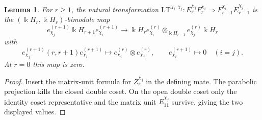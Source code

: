 \documentclass[12pt]{amsart}
\numberwithin{itemcounter}{subsection}
\theoremstyle{plain}
\newtheorem{lemma}[theorem]{Lemma}
\theoremstyle{definition}
\theoremstyle{remark}
\numberwithin{equation}{section}
\def\k{\Bbbk}
\def\Lcross{\mathrm{LT}}
\begin{document}
\begin{lemma}\label{rcrosswreath}
For $r\geq1$, the natural transformation
$\Lcross^{\chi_i,\chi_j}:E^{\chi_j}_rF^{\chi_i}_r
\Rightarrow F^{\chi_i}_{r-1}E^{\chi_j}_{r-1}$ is the
$(\k H_r,\k H_r)$-bimodule map
\[
 e^{(r+1)}_{\chi_j}\k H_{r+1}e^{(r+1)}_{\chi_i}
 \longrightarrow \k H_r e^{(r)}_{\chi_i}\otimes_{\k H_{r-1}}
 e^{(r)}_{\chi_j}\k H_r
\]
with
\[
 e^{(r+1)}_{\chi_j}(r,r+1)e^{(r+1)}_{\chi_i}
 \longmapsto e^{(r)}_{\chi_i}\otimes e^{(r)}_{\chi_j},
 \qquad e^{(r+1)}_{\chi_i}\longmapsto0\quad(i=j).
\]
At $r=0$ this map is zero.
\end{lemma}
\begin{proof}
Insert the matrix-unit formula for $Z_r^{\chi_j}$ in the defining mate.
The parabolic projection kills the closed double coset.  On the open double
coset only the identity coset representative and the matrix unit
$E^{\chi_j}_{11}$ survive, giving the two displayed values.
\end{proof}
\end{document}
